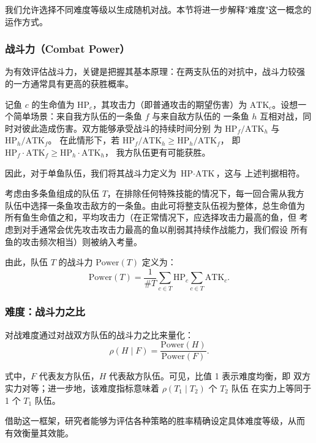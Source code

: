 我们允许选择不同难度等级以生成随机对战。本节将进一步解释"难度"这一概念的
运作方式。

\subsubsection*{战斗力（Combat Power）}

为有效评估战斗力，关键是把握其基本原理：在两支队伍的对抗中，战斗力较强
的一方通常具有更高的获胜概率。

记鱼 $c$ 的生命值为 $\text{HP}_c$，其攻击力（即普通攻击的期望伤害）为
$\text{ATK}_c$。设想一个简单场景：来自我方队伍的一条鱼 $f$ 与来自敌方队伍的
一条鱼 $h$ 互相对战，同时对彼此造成伤害。双方能够承受战斗的持续时间分别
为 $\text{HP}_f / \text{ATK}_h$ 与 $\text{HP}_h / \text{ATK}_f$。
在此情形下，若 $\text{HP}_f / \text{ATK}_h \ge \text{HP}_h / \text{ATK}_f$，
即 $\text{HP}_f \cdot \text{ATK}_f \ge \text{HP}_h \cdot \text{ATK}_h$，
我方队伍更有可能获胜。

因此，对于单鱼队伍，我们将其战斗力定义为 $\text{HP} \cdot \text{ATK}$，这与
上述判据相符。

考虑由多条鱼组成的队伍 $T$，在排除任何特殊技能的情况下，每一回合需从我方
队伍中选择一条鱼攻击敌方的一条鱼。由此可将整支队伍视为整体，总生命值为
所有鱼生命值之和，平均攻击力（在正常情况下，应选择攻击力最高的鱼，但
考虑到对手通常会优先攻击攻击力最高的鱼以削弱其持续作战能力，我们假设
所有鱼的攻击频次相当）则被纳入考量。

由此，队伍 $T$ 的战斗力 $\text{Power}(T)$ 定义为：
\begin{equation}\label{eq:power}
    \text{Power}(T) = \frac{1}{\#T} \sum_{c \in T} \text{HP}_c \sum_{c \in T} \text{ATK}_c.
\end{equation}

\subsubsection*{难度：战斗力之比}

对战难度通过对战双方队伍的战斗力之比来量化：
\begin{equation}\label{eq:rho}
    \rho(H \mid F) = \frac{\text{Power}(H)}{\text{Power}(F)}.
\end{equation}

式中，$F$ 代表友方队伍，$H$ 代表敌方队伍。可见，比值 1 表示难度均衡，即
双方实力对等；进一步地，该难度指标意味着 $\rho(T_1 \mid T_2)$ 个 $T_2$ 队伍
在实力上等同于 1 个 $T_1$ 队伍。

借助这一框架，研究者能够为评估各种策略的胜率精确设定具体难度等级，从而
有效衡量其效能。
